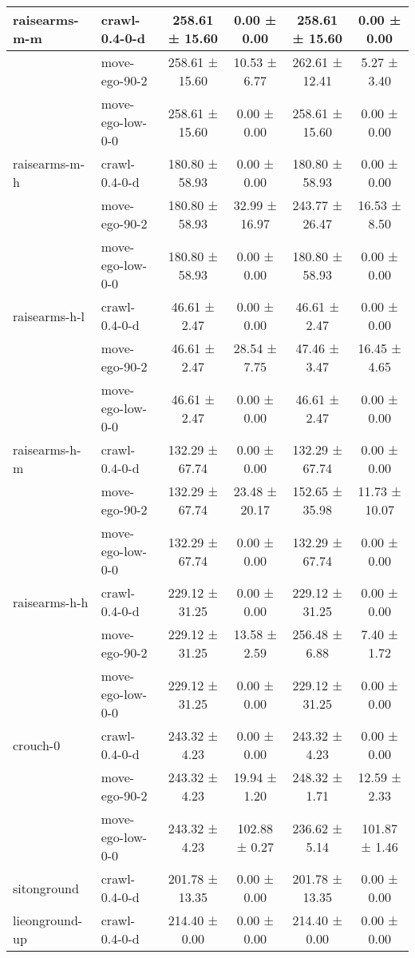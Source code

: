 \begin{tabular}{|l|l|c|c|c|c|}
\hline
raisearms-m-m & crawl-0.4-0-d & 258.61 ± 15.60 & 0.00 ± 0.00 & 258.61 ± 15.60 & 0.00 ± 0.00 \\
\hline
 & move-ego-90-2 & 258.61 ± 15.60 & 10.53 ± 6.77 & 262.61 ± 12.41 & 5.27 ± 3.40 \\
\hline
 & move-ego-low-0-0 & 258.61 ± 15.60 & 0.00 ± 0.00 & 258.61 ± 15.60 & 0.00 ± 0.00 \\
\hline
raisearms-m-h & crawl-0.4-0-d & 180.80 ± 58.93 & 0.00 ± 0.00 & 180.80 ± 58.93 & 0.00 ± 0.00 \\
\hline
 & move-ego-90-2 & 180.80 ± 58.93 & 32.99 ± 16.97 & 243.77 ± 26.47 & 16.53 ± 8.50 \\
\hline
 & move-ego-low-0-0 & 180.80 ± 58.93 & 0.00 ± 0.00 & 180.80 ± 58.93 & 0.00 ± 0.00 \\
\hline
raisearms-h-l & crawl-0.4-0-d & 46.61 ± 2.47 & 0.00 ± 0.00 & 46.61 ± 2.47 & 0.00 ± 0.00 \\
\hline
 & move-ego-90-2 & 46.61 ± 2.47 & 28.54 ± 7.75 & 47.46 ± 3.47 & 16.45 ± 4.65 \\
\hline
 & move-ego-low-0-0 & 46.61 ± 2.47 & 0.00 ± 0.00 & 46.61 ± 2.47 & 0.00 ± 0.00 \\
\hline
raisearms-h-m & crawl-0.4-0-d & 132.29 ± 67.74 & 0.00 ± 0.00 & 132.29 ± 67.74 & 0.00 ± 0.00 \\
\hline
 & move-ego-90-2 & 132.29 ± 67.74 & 23.48 ± 20.17 & 152.65 ± 35.98 & 11.73 ± 10.07 \\
\hline
 & move-ego-low-0-0 & 132.29 ± 67.74 & 0.00 ± 0.00 & 132.29 ± 67.74 & 0.00 ± 0.00 \\
\hline
raisearms-h-h & crawl-0.4-0-d & 229.12 ± 31.25 & 0.00 ± 0.00 & 229.12 ± 31.25 & 0.00 ± 0.00 \\
\hline
 & move-ego-90-2 & 229.12 ± 31.25 & 13.58 ± 2.59 & 256.48 ± 6.88 & 7.40 ± 1.72 \\
\hline
 & move-ego-low-0-0 & 229.12 ± 31.25 & 0.00 ± 0.00 & 229.12 ± 31.25 & 0.00 ± 0.00 \\
\hline
crouch-0 & crawl-0.4-0-d & 243.32 ± 4.23 & 0.00 ± 0.00 & 243.32 ± 4.23 & 0.00 ± 0.00 \\
\hline
 & move-ego-90-2 & 243.32 ± 4.23 & 19.94 ± 1.20 & 248.32 ± 1.71 & 12.59 ± 2.33 \\
\hline
 & move-ego-low-0-0 & 243.32 ± 4.23 & 102.88 ± 0.27 & 236.62 ± 5.14 & 101.87 ± 1.46 \\
\hline
sitonground & crawl-0.4-0-d & 201.78 ± 13.35 & 0.00 ± 0.00 & 201.78 ± 13.35 & 0.00 ± 0.00 \\
\hline
lieonground-up & crawl-0.4-0-d & 214.40 ± 0.00 & 0.00 ± 0.00 & 214.40 ± 0.00 & 0.00 ± 0.00 \\

\end{tabular}
